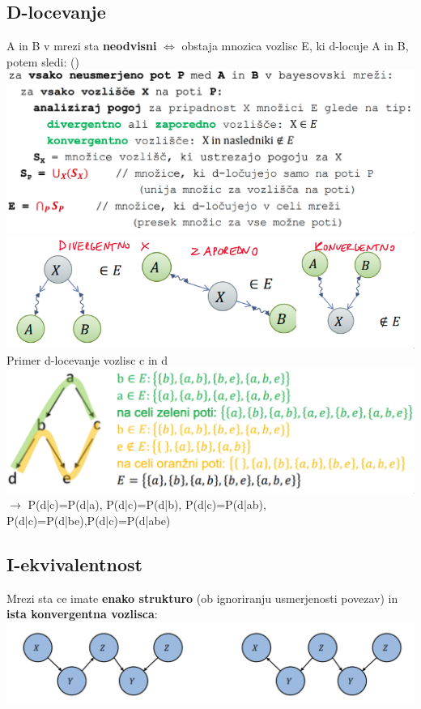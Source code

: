 \subsection{D-locevanje}
A in B v mrezi sta \textbf{neodvisni} $\Leftrightarrow$ obstaja mnozica vozlisc E, ki d-locuje A in B, potem sledi:  ()\\
\includegraphics[width=\columnwidth]{images/d-locevanje-algoritem.png}
\includegraphics*[width=\columnwidth]{images/d-locevanje-nacini.png}
\\
Primer d-locevanje vozlisc c in d\\
\includegraphics*[width=\columnwidth]{images/primer-d-locevanje.png}\\
$\rightarrow$ P(d|c)=P(d|a), P(d|c)=P(d|b), P(d|c)=P(d|ab),\\
P(d|c)=P(d|be),P(d|c)=P(d|abe)
\subsection{I-ekvivalentnost}
Mrezi sta  ce imate \textbf{enako strukturo} (ob ignoriranju usmerjenosti povezav) in \textbf{ista konvergentna vozlisca}:\\
\includegraphics[width=\columnwidth]{images/i-ekvivalentnost.png}